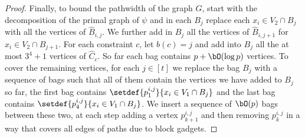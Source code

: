 \begin{proof}
    Finally, to bound the pathwidth of the graph $G$,
    start with the decomposition of the primal graph of $\psi$ and
    in each $B_j$ replace each $x_i \in V_2 \cap B_j$ with all the vertices of $\hat{B}_{i,j}$.
    We further add in $B_j$ all the vertices of $\hat{B}_{i,j+1}$ for $x_i \in V_2 \cap B_{j+1}$.
    For each constraint $c$, let $b(c)=j$ and add into $B_j$ all the at most $3^4 + 1$
    vertices of $\hat{C}_c$.
    So far each bag contains $p + \bO(\log p)$ vertices.
    To cover the remaining vertices,
    for each $j \in [t]$ we replace the bag $B_j$ with a sequence of bags such that
    all of them contain the vertices we have added to $B_j$ so far,
    the first bag contains $\setdef{p^{i,j}_1}{x_i \in V_1 \cap B_j}$ and
    the last bag contains $\setdef{p^{i,j}_4}{x_i \in V_1 \cap B_j}$.
    We insert a sequence of $\bO(p)$ bags between these two,
    at each step adding a vertex $p^{i,j}_{k+1}$ and then removing $p^{i,j}_k$
    in a way that covers all edges of paths due to block gadgets.
\end{proof}
